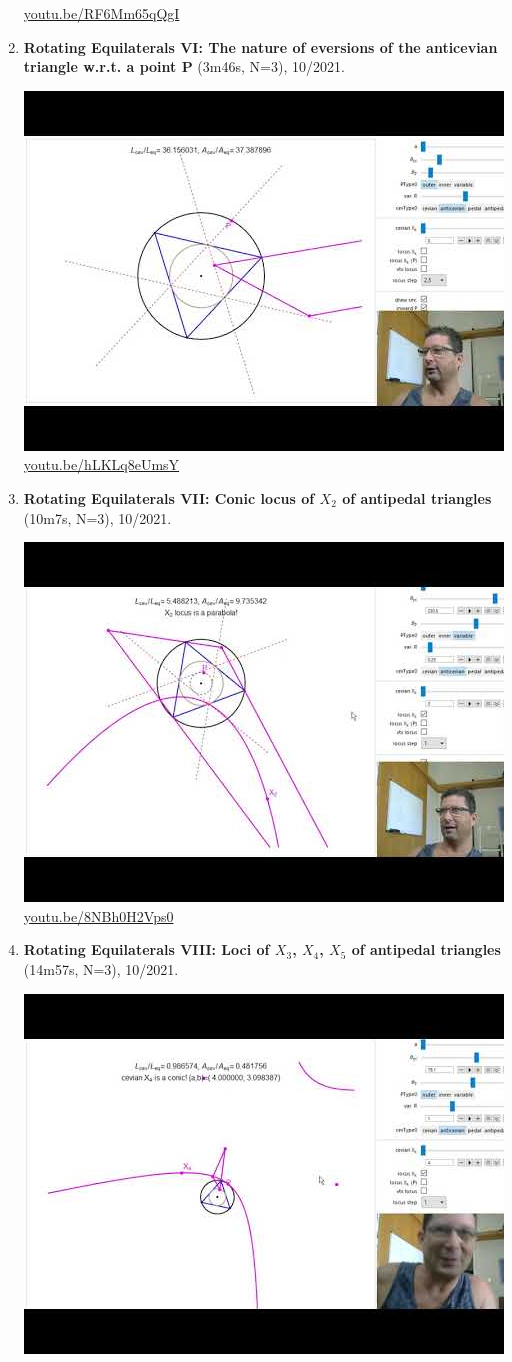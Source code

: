\documentclass[12pt]{amsart}
\begin{document}
\begin{enumerate}[resume]
\begin{center}
\href{https://youtu.be/RF6Mm65qQgI}{\url{youtu.be/RF6Mm65qQgI}}\end{center}
% 
\item \textbf{Rotating Equilaterals VI: The nature of eversions of the anticevian triangle w.r.t. a point P} (3m46s, N=3), 10/2021. 
\begin{center}\includegraphics[width=.5\textwidth]{pics/hLKLq8eUmsY.jpg} \\ 
\href{https://youtu.be/hLKLq8eUmsY}{\url{youtu.be/hLKLq8eUmsY}}\end{center}
% 
\item \textbf{Rotating Equilaterals VII: Conic locus of $X_{2}$ of antipedal triangles} (10m7s, N=3), 10/2021. 
\begin{center}\includegraphics[width=.5\textwidth]{pics/8NBh0H2Vps0.jpg} \\ 
\href{https://youtu.be/8NBh0H2Vps0}{\url{youtu.be/8NBh0H2Vps0}}\end{center}
% 
\item \textbf{Rotating Equilaterals VIII: Loci of $X_{3}$, $X_{4}$, $X_{5}$ of antipedal triangles} (14m57s, N=3), 10/2021. 
\begin{center}\includegraphics[width=.5\textwidth]{pics/wiknzClcm4s.jpg} \\ 

\end{center}
\end{enumerate}
\end{document}
